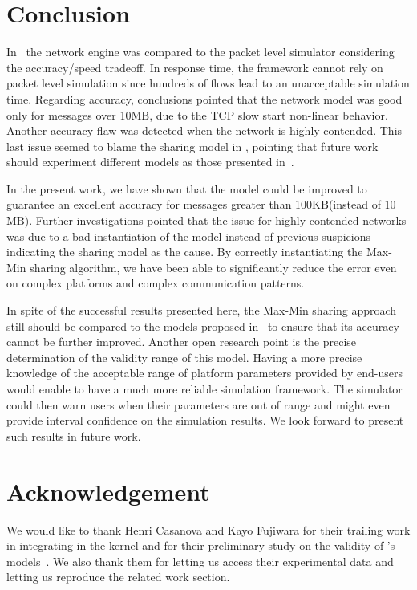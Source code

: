 \documentclass{sig-alternate}
\def\MB{\ensuremath{\text{MB}}\xspace}%
\def\KB{\ensuremath{\text{KB}}\xspace}%
\begin{document}
\section{Conclusion}
\label{sec.conclusion}

In~\cite{nstools07} the \simgrid network engine
was compared to the \gtnets packet level simulator considering the
accuracy/speed tradeoff. In response time, the \simgrid framework cannot
rely on packet level simulation since hundreds of flows lead to an
unacceptable simulation time. Regarding accuracy, conclusions pointed
that the \simgrid network model was good only for messages over 10\MB, due to the TCP slow
start non-linear behavior. Another accuracy flaw was 
detected when the network is highly contended. This last issue
seemed to blame the sharing model in \simgrid, pointing that
future work should experiment different models as those presented
in~\cite{Low03}. 

In the present work, we have shown that the \simgrid model could be
improved to guarantee an excellent accuracy for messages greater than
100\KB (instead of 10\MB). Further investigations pointed that the
issue for highly contended networks was due to a bad instantiation of
the model instead of previous suspicions indicating the sharing model
as the cause.  By correctly instantiating the \simgrid Max-Min sharing
algorithm, we have been able to significantly reduce the error even on
complex platforms and complex communication patterns.

In spite of the successful results presented here, the Max-Min sharing
approach still should be compared to the models proposed
in~\cite{Low03} to ensure that its accuracy cannot be further
improved. Another open research point is the precise determination of
the validity range of this model. Having a more precise knowledge of
the acceptable range of platform parameters provided by \simgrid
end-users would enable to have a much more reliable simulation
framework. The simulator could then warn users when their parameters
are out of range and might even provide interval confidence on the simulation
results. We look forward to present such results in future work.

\section*{Acknowledgement}
We would like to thank Henri Casanova and Kayo Fujiwara for their
trailing work in integrating \gtnets in the \simgrid kernel and for
their preliminary study on the validity of \simgrid's
models~\cite{nstools07}. We also thank them for letting us access
their experimental data and letting us reproduce the related work
section. 
\end{document}
